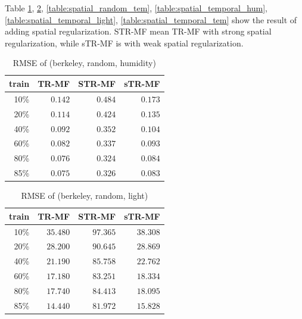 Table \ref{table:spatial_random_hum}, \ref{table:spatial_random_light}, \ref{table:spatial_random_tem}, \ref{table:spatial_temporal_hum}, \ref{table:spatial_temporal_light}, \ref{table:spatial_temporal_tem}  show the result of adding spatial regularization. STR-MF mean TR-MF with strong spatial regularization, while sTR-MF is with weak spatial regularization.

\begin{table} [htbp]
\setlength{\tabcolsep}{2pt}
\centering
\caption{RMSE of (berkeley, random, humidity)}
\label{table:spatial_random_hum}
\begin{tabular} {r | r r r}
	train	& TR-MF	&	STR-MF	&	sTR-MF	\\ \hline
	10\% & $ \mathbf{ 0.142 } $ & $ 0.484 $ & $ 0.173 $ \\
	20\% & $ \mathbf{ 0.114 } $ & $ 0.424 $ & $ 0.135 $ \\
	40\% & $ \mathbf{ 0.092 } $ & $ 0.352 $ & $ 0.104 $ \\
	60\% & $ \mathbf{ 0.082 } $ & $ 0.337 $ & $ 0.093 $ \\
	80\% & $ \mathbf{ 0.076 } $ & $ 0.324 $ & $ 0.084 $ \\
	85\% & $ \mathbf{ 0.075 } $ & $ 0.326 $ & $ 0.083 $ \\
\end{tabular}
\end{table}


\begin{table} [htbp]
\setlength{\tabcolsep}{2pt}
\centering
\caption{RMSE of (berkeley, random, light)}
\label{table:spatial_random_light}
\begin{tabular} {r | r r r}
	train	& TR-MF	&	STR-MF	&	sTR-MF	\\ \hline
	10\% & $ \mathbf{ 35.480 } $ & $ 97.365 $ & $ 38.308 $ \\
	20\% & $ \mathbf{ 28.200 } $ & $ 90.645 $ & $ 28.869 $ \\
	40\% & $ \mathbf{ 21.190 } $ & $ 85.758 $ & $ 22.762 $ \\
	60\% & $ \mathbf{ 17.180 } $ & $ 83.251 $ & $ 18.334 $ \\
	80\% & $ \mathbf{ 17.740 } $ & $ 84.413 $ & $ 18.095 $ \\
	85\% & $ \mathbf{ 14.440 } $ & $ 81.972 $ & $ 15.828 $ \\
\end{tabular}
\end{table}


